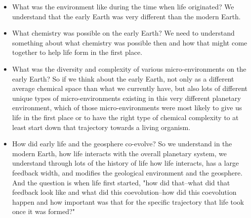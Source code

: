 \documentclass[]{article}
\begin{document}
\begin{itemize}
	\item What was the environment like during the time when life originated?
	We understand that the early Earth was 	very different than the modern Earth.
	\item What chemistry was possible on the early Earth? We need to understand something about what chemistry was possible then and how that might come together to help 	life form in the first place.
	\item What was the diversity and complexity of various micro-environments on the early Earth? So if we think about the early Earth, not
	only as a different average chemical
	space than what we currently have, but
	also lots of different unique types of
	micro-environments existing in this very
	different planetary environment, which of
	those micro-environments were most likely
	to give us life in the first place or to
	have the right type of chemical complexity
	to at least start down that trajectory
	towards a living organism.
	
	\item How did early life and the geosphere co-evolve? 
	So we understand in the modern Earth, how
	life interacts with the overall planetary
	system, we understand through lots of the
	history of life how life interacts,
	has a large feedback width, and modifies
	the geological environment and the
	geosphere. And the question is when life
	first started, "how did that--what did
	that feedback look like and what did this
	coevolution--how did this coevolution
	happen and how important was that for the
	specific trajectory that life took once
	it was formed?"
\end{itemize}
\end{document}
